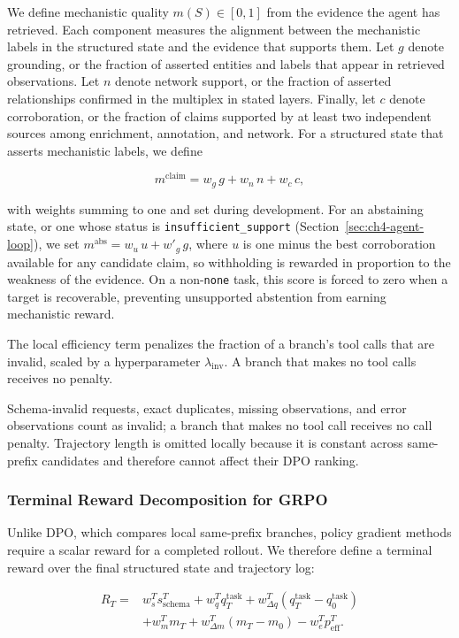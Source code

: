 \documentclass[thesis,letterpaper,12pt]{utthesis}
\begin{document}
We define mechanistic quality $m(S) \in [0,1]$ from the evidence the agent has retrieved. Each component measures the alignment between the mechanistic labels in the structured state and the evidence that supports them. Let $g$ denote grounding, or the fraction of asserted entities and labels that appear in retrieved observations. Let $n$ denote network support, or the fraction of asserted relationships confirmed in the multiplex in stated layers. Finally, let $c$ denote corroboration, or the fraction of claims supported by at least two independent sources among enrichment, annotation, and network. For a structured state that asserts mechanistic labels, we define

\begin{equation*}
    m^{\mathrm{claim}} = w_g\,g + w_n\,n + w_c\,c,
\end{equation*}

with weights summing to one and set during development. For an abstaining state, or one whose status is \texttt{insufficient\_support} (Section~\ref{sec:ch4-agent-loop}), we set $m^{\mathrm{abs}} = w_u\,u + w'_g\,g$, where $u$ is one minus the best corroboration available for any candidate claim, so withholding is rewarded in proportion to the weakness of the evidence. On a non-\texttt{none} task, this score is forced to zero when a target is recoverable, preventing unsupported abstention from earning mechanistic reward.

The local efficiency term penalizes the fraction of a branch's tool calls that are invalid, scaled by a hyperparameter $\lambda_{\mathrm{inv}}$. A branch that makes no tool calls receives no penalty.

Schema-invalid requests, exact duplicates, missing observations, and error observations count as invalid; a branch that makes no tool call receives no call penalty. Trajectory length is omitted locally because it is constant across same-prefix candidates and therefore cannot affect their DPO ranking.

\subsubsection{Terminal Reward Decomposition for GRPO}\label{sec:ch4-terminal-reward}
Unlike DPO, which compares local same-prefix branches, policy gradient methods require a scalar reward for a completed rollout. We therefore define a terminal reward over the final structured state and trajectory log:

\begin{equation*}
\begin{aligned}
    R_T={}&w_s^T s_{\mathrm{schema}}^T
    +w_q^T q_T^{\mathrm{task}}
    +w_{\Delta q}^T\left(q_T^{\mathrm{task}}-q_0^{\mathrm{task}}\right) \\
    &+w_m^T m_T
    +w_{\Delta m}^T(m_T-m_0)
    -w_e^T p_{\mathrm{eff}}^T.
\end{aligned}
\end{equation*}
\end{document}
